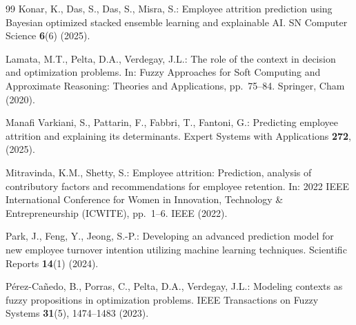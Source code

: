 \documentclass[runningheads]{llncs}
\begin{document}
\begin{thebibliography}{99}
Konar, K., Das, S., Das, S., Misra, S.: Employee attrition prediction using Bayesian optimized stacked ensemble learning and explainable AI. SN Computer Science \textbf{6}(6) (2025). 

Lamata, M.T., Pelta, D.A., Verdegay, J.L.: The role of the context in decision and optimization problems. In: Fuzzy Approaches for Soft Computing and Approximate Reasoning: Theories and Applications, pp.~75--84. Springer, Cham (2020). 

Manafi Varkiani, S., Pattarin, F., Fabbri, T., Fantoni, G.: Predicting employee attrition and explaining its determinants. Expert Systems with Applications \textbf{272}, (2025). 

Mitravinda, K.M., Shetty, S.: Employee attrition: Prediction, analysis of contributory factors and recommendations for employee retention. In: 2022 IEEE International Conference for Women in Innovation, Technology \& Entrepreneurship (ICWITE), pp.~1--6. IEEE (2022). 

Park, J., Feng, Y., Jeong, S.-P.: Developing an advanced prediction model for new employee turnover intention utilizing machine learning techniques. Scientific Reports \textbf{14}(1) (2024). 

Pérez-Cañedo, B., Porras, C., Pelta, D.A., Verdegay, J.L.: Modeling contexts as fuzzy propositions in optimization problems. IEEE Transactions on Fuzzy Systems \textbf{31}(5), 1474--1483 (2023). 
\end{thebibliography}
\appendix
\end{document}
